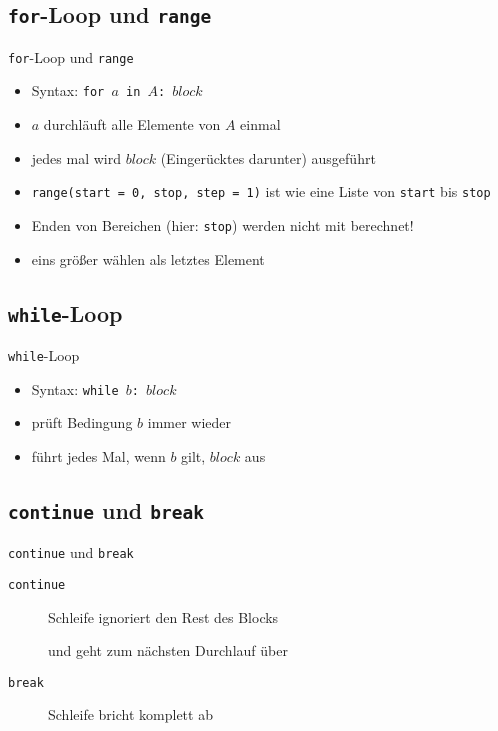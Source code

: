\subsection{\texttt{for}-Loop und \texttt{range}}
\begin{frame}{\texttt{for}-Loop und \texttt{range}}
	\begin{itemize}
		\item Syntax: \texttt{for $a$ in $A$: $block$}
		\item $a$ durchläuft alle Elemente von $A$ einmal
		\item jedes mal wird $block$ (Eingerücktes darunter) ausgeführt
		\item \texttt{range(start = 0, stop, step = 1)} ist wie eine Liste von \texttt{start} bis \texttt{stop}
		\item Enden von Bereichen (hier: \texttt{stop}) werden nicht mit berechnet!
		\item eins größer wählen als letztes Element
	\end{itemize}
\end{frame}

\subsection{\texttt{while}-Loop}
\begin{frame}{\texttt{while}-Loop}
	\begin{itemize}
		\item Syntax: \texttt{while $b$: $block$}
		\item prüft Bedingung $b$ immer wieder
		\item führt jedes Mal, wenn $b$ gilt, $block$ aus
	\end{itemize}
\end{frame}

\subsection{\texttt{continue} und \texttt{break}}
\begin{frame}{\texttt{continue} und \texttt{break}}
	\begin{description}
		\item[\texttt{continue}] Schleife ignoriert den Rest des Blocks
		\item[]	und geht zum nächsten Durchlauf über
		\item[\texttt{break}] Schleife bricht komplett ab
	\end{description}
\end{frame}

